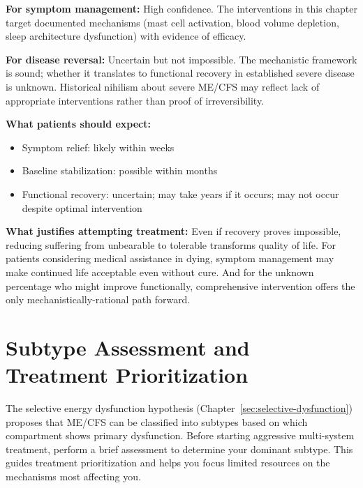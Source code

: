 \textbf{For symptom management:} High confidence. The interventions in this chapter target documented mechanisms (mast cell activation, blood volume depletion, sleep architecture dysfunction) with evidence of efficacy.

\textbf{For disease reversal:} Uncertain but not impossible. The mechanistic framework is sound; whether it translates to functional recovery in established severe disease is unknown. Historical nihilism about severe ME/CFS may reflect lack of appropriate interventions rather than proof of irreversibility.

\textbf{What patients should expect:}
\begin{itemize}
    \item Symptom relief: likely within weeks
    \item Baseline stabilization: possible within months
    \item Functional recovery: uncertain; may take years if it occurs; may not occur despite optimal intervention
\end{itemize}

\textbf{What justifies attempting treatment:} Even if recovery proves impossible, reducing suffering from unbearable to tolerable transforms quality of life. For patients considering medical assistance in dying, symptom management may make continued life acceptable even without cure. And for the unknown percentage who might improve functionally, comprehensive intervention offers the only mechanistically-rational path forward.

\section{Subtype Assessment and Treatment Prioritization}
\label{sec:subtype-assessment}

The selective energy dysfunction hypothesis (Chapter~\ref{sec:selective-dysfunction}) proposes that ME/CFS can be classified into subtypes based on which compartment shows primary dysfunction. Before starting aggressive multi-system treatment, perform a brief assessment to determine your dominant subtype. This guides treatment prioritization and helps you focus limited resources on the mechanisms most affecting you.

